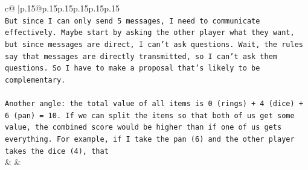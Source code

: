 \documentclass{article}
\begin{document}
{\begin{supertabular}{c@{$\;$}|p{.15\linewidth}@{}p{.15\linewidth}p{.15\linewidth}p{.15\linewidth}p{.15\linewidth}p{.15\linewidth}}
{{{\\ 
\texttt{But since I can only send 5 messages, I need to communicate effectively. Maybe start by asking the other player what they want, but since messages are direct, I can't ask questions. Wait, the rules say that messages are directly transmitted, so I can't ask them questions. So I have to make a proposal that's likely to be complementary.} \\
\\ 
\texttt{Another angle: the total value of all items is 0 (rings) + 4 (dice) + 6 (pan) = 10. If we can split the items so that both of us get some value, the combined score would be higher than if one of us gets everything. For example, if I take the pan (6) and the other player takes the dice (4), that} \\
            }
        }
    }
    & & \\ \\


\end{supertabular}}
\end{document}
